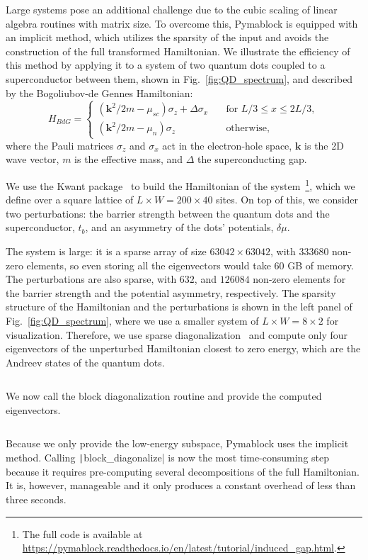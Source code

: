 Large systems pose an additional challenge due to the cubic scaling of linear algebra routines with matrix size.
To overcome this, Pymablock is equipped with an implicit method, which utilizes the sparsity of the input and avoids the construction of the full transformed Hamiltonian.
We illustrate the efficiency of this method by applying it to a system of two quantum dots coupled to a superconductor between them, shown in
Fig.~\ref{fig:QD_spectrum}, and described by the Bogoliubov-de Gennes Hamiltonian:
%
\begin{equation}
    H_{BdG} =
    \begin{cases}
        (\mathbf{k}^2/2m - \mu_{sc}) \sigma_z + \Delta \sigma_x \quad & \text{for } L/3 \leq x \leq 2L/3, \\
        (\mathbf{k}^2/2m - \mu_n) \sigma_z \quad & \text{otherwise},
    \end{cases}
\end{equation}
where the Pauli matrices $\sigma_z$ and $\sigma_x$ act in the electron-hole space, $\mathbf{k}$ is the 2D wave vector, $m$ is the effective mass, and $\Delta$ the superconducting gap.

We use the Kwant package~\cite{Groth_2014} to build the Hamiltonian of the system~\footnote{The full code is available at \url{https://pymablock.readthedocs.io/en/latest/tutorial/induced_gap.html}.}, which we define over a square lattice of $L \times W = 200 \times 40$ sites.
On top of this, we consider two perturbations: the barrier strength between the quantum dots and the superconductor, $t_b$, and an asymmetry of the dots' potentials, $\delta \mu$.

The system is large: it is a sparse array of size $63042 \times 63042$, with $333680$ non-zero elements, so even storing all the eigenvectors would take $60$ GB of memory.
The perturbations are also sparse, with $632$, and $126084$ non-zero elements for the barrier strength and the potential asymmetry, respectively.
The sparsity structure of the Hamiltonian and the perturbations is shown in the left panel of Fig.~\ref{fig:QD_spectrum}, where we use a smaller system of $L \times W = 8 \times 2$ for visualization.
Therefore, we use sparse diagonalization~\cite{Virtanen_2020} and compute only four eigenvectors of the unperturbed Hamiltonian closest to zero energy, which are the Andreev states of the quantum dots.
%
\inputminted[firstline=61, lastline=62]{python}{code_figures/lattice_system.py}
%
We now call the block diagonalization routine and provide the computed eigenvectors.
%
\inputminted[firstline=64, lastline=64]{python}{code_figures/lattice_system.py}
%
Because we only provide the low-energy subspace, Pymablock uses the implicit method.
Calling \texttt|block_diagonalize| is now the most time-consuming step because it requires pre-computing several decompositions of the full Hamiltonian.
It is, however, manageable and it only produces a constant overhead of less than three seconds.

